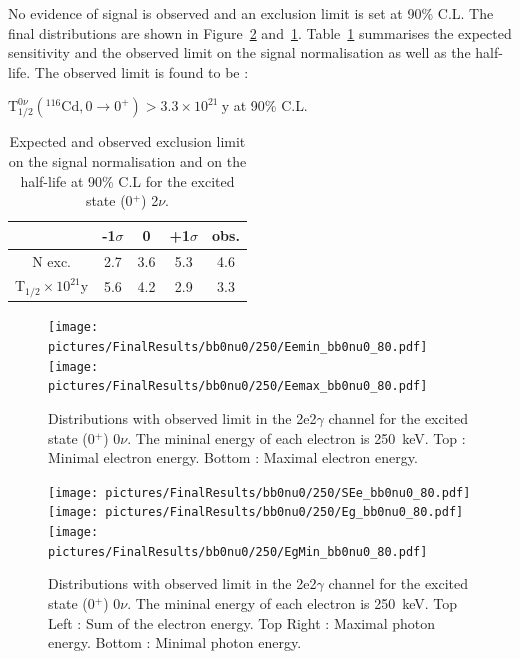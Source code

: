 \documentclass[main.tex]{subfiles}
\begin{document}
\NI No evidence of signal is observed and an exclusion limit is set at 90\% C.L. The final distributions are shown in Figure~\ref{plot:SEeAndEg250bb0nu0} and~\ref{plot:EeminAndEemax250bb0nu0}. Table~\ref{Tab:FinalResultsbb0nu0} summarises the expected sensitivity and the observed limit on the signal normalisation as well as the half-life. The observed limit is found to be :

\begin{center}
$ \text{T}_{\text{1/2}}^{\text{0}\nu} (^{\text{116}} \text{Cd}, \text{0} \rightarrow \text{0}^{+}) > \text{3.3} \times \text{10}^{\text{21}}~\text{y}$ at 90\% C.L.
\end{center}


\begin{table}
\centering
\begin{tabular}{c|c|c|c||c}
                                                & -1$\sigma$ & 0        & +1$\sigma$ & obs.     \\[0.2cm]
\hline
N exc.                                          & 2.7        & 3.6      & 5.3        & 4.6     \\[0.2cm]
T$_{\text{1/2}} \times \text{10}^{\text{21}}$y  & 5.6        & 4.2      & 2.9        & 3.3      \\[0.2cm]
\hline
\end{tabular}
\caption{Expected and observed exclusion limit on the signal normalisation and on the half-life at 90\% C.L for the excited state (0$^+$) 2$\nu$.}
\label{Tab:FinalResultsbb0nu0}
\end{table}


\begin{figure} [h!]
\begin{center}
\texttt{[image: pictures/FinalResults/bb0nu0/250/Eemin\_bb0nu0\_80.pdf]}
\texttt{[image: pictures/FinalResults/bb0nu0/250/Eemax\_bb0nu0\_80.pdf]}
\end{center}
\caption{Distributions with observed limit in the 2e2$\gamma$ channel for the excited state (0$^+$) 0$\nu$. The mininal energy of each electron is 250~keV. Top : Minimal electron energy. Bottom : Maximal electron energy.}
\label{plot:EeminAndEemax250bb0nu0}
\end{figure}


\begin{figure} [h!]
\begin{center}
\texttt{[image: pictures/FinalResults/bb0nu0/250/SEe\_bb0nu0\_80.pdf]}
\texttt{[image: pictures/FinalResults/bb0nu0/250/Eg\_bb0nu0\_80.pdf]}
\texttt{[image: pictures/FinalResults/bb0nu0/250/EgMin\_bb0nu0\_80.pdf]}
\end{center}
\caption{Distributions with observed limit in the 2e2$\gamma$ channel for the excited state (0$^+$) 0$\nu$. The mininal energy of each electron is 250~keV. Top Left : Sum of the electron energy. Top Right : Maximal photon energy. Bottom : Minimal photon energy.}
\label{plot:SEeAndEg250bb0nu0}
\end{figure}
\end{document}
